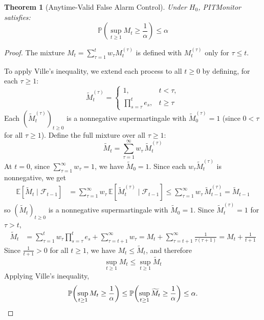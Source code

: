 \documentclass[ejsv2, noshowframe]{imsart}
\theoremstyle{plain}
\newtheorem{theorem}{Theorem}
\theoremstyle{definition}
\theoremstyle{remark}
\newcommand{\E}{\mathbb{E}}
\newcommand{\Prob}{\mathbb{P}}
\begin{document}
\begin{theorem}[Anytime-Valid False Alarm Control]
\label{thm:type1}
Under $H_0$, PITMonitor satisfies:
\begin{equation}
 \Prob\left(\sup_{t \geq 1} M_t \geq \frac{1}{\alpha}\right) \leq \alpha
\end{equation}
\end{theorem}
\begin{proof}
The mixture $M_t = \sum_{\tau=1}^{t} w_\tau M_t^{(\tau)}$ is defined with $M_t^{(\tau)}$ only for $\tau \leq t$.

\noindent To apply Ville's inequality, we extend each process to all $t \geq 0$ by defining, for each $\tau \geq 1$:
\begin{equation*}
\widetilde{M}_t^{(\tau)} =
\begin{cases}
1, & t < \tau,\\[2mm]
\prod_{s=\tau}^{t} e_s, & t \ge \tau
\end{cases}
\end{equation*}
Each $(\widetilde{M}_t^{(\tau)})_{t \ge 0}$ is a nonnegative supermartingale with $\widetilde{M}_0^{(\tau)} = 1$ (since $0 < \tau$ for all $\tau \ge 1$). Define the full mixture over all $\tau \ge 1$:
$$
\widetilde{M}_t = \sum_{\tau=1}^{\infty} w_\tau\,\widetilde{M}_t^{(\tau)}
$$
At $t=0$, since $\sum_{\tau=1}^{\infty} w_\tau = 1$, we have $\widetilde{M}_0 = 1$. Since each $w_\tau \widetilde{M}_t^{(\tau)}$ is nonnegative, we get
\begin{align*}
\E[\widetilde{M}_t \mid \mathcal{F}_{t-1}]
&= \sum_{\tau=1}^{\infty} w_\tau\, \E[\widetilde{M}_t^{(\tau)} \mid \mathcal{F}_{t-1}]
\le \sum_{\tau=1}^{\infty} w_\tau\, \widetilde{M}_{t-1}^{(\tau)}
= \widetilde{M}_{t-1}
\end{align*}
so $(\widetilde{M}_t)_{t \ge 0}$ is a nonnegative supermartingale with $\widetilde{M}_0 = 1$. Since $\widetilde{M}_t^{(\tau)} = 1$ for $\tau > t$,
\begin{align*}
\widetilde{M}_t
&= \sum_{\tau=1}^{t} w_\tau \prod_{s=\tau}^{t} e_s
 + \sum_{\tau=t+1}^{\infty} w_\tau
= M_t + \sum_{\tau=t+1}^{\infty}\frac{1}{\tau(\tau+1)} = M_t + \frac{1}{t+1}
\end{align*}
Since $\frac{1}{t+1} > 0$ for all $t \geq 1$, we have $M_t \le \widetilde{M}_t$, and therefore 
$$
\sup_{t \ge 1} M_t \le \sup_{t \ge 1} \widetilde{M}_t
$$
Applying Ville's inequality,
\begin{equation*}
\Prob\!\left(\sup_{t\ge1} M_t \ge \frac{1}{\alpha}\right)
\le
\Prob\!\left(\sup_{t\ge1} \widetilde{M}_t \ge \frac{1}{\alpha}\right)
\le \alpha. \qedhere
\end{equation*}
\end{proof}
\end{document}
